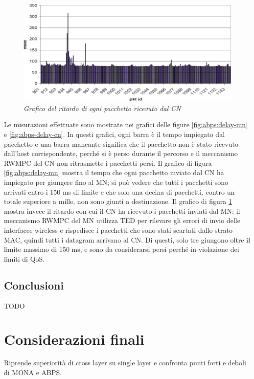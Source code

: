 \documentclass[12pt,a4paper,openright,twoside]{book}
\begin{document}
\begin{figure}
  \centering
  \includegraphics[width=\textwidth]{img/abps-delay-cn}
  \caption{\em Grafico del ritardo di ogni pacchetto ricevuto dal CN}
  \label{fig:abps:delay-cn}
\end{figure}

Le misurazioni effettuate sono mostrate nei grafici delle figure
\ref{fig:abps:delay-mn} e \ref{fig:abps-delay-cn}. In questi grafici,
ogni barra è il tempo impiegato dal pacchetto e una barra mancante
significa che il pacchetto non è stato ricevuto dall'host
corrispondente, perché si è perso durante il percorso e il meccanismo
RWMPC del CN non ritrasmette i pacchetti persi. Il grafico di figura
\ref{fig:abps:delay-mn} mostra il tempo che ogni pacchetto inviato dal
CN ha impiegato per giungere fino al MN; si può vedere che tutti i
pacchetti sono arrivati entro i 150 ms di limite e che solo una decina
di pacchetti, contro un totale superiore a mille, non sono giunti a
destinazione. Il grafico di figura \ref{fig:abps:delay-cn} mostra
invece il ritardo con cui il CN ha ricevuto i pacchetti inviati dal
MN; il meccanismo RWMPC del MN utilizza TED per rilevare gli errori di
invio delle interfacce wireless e rispedisce i pacchetti che sono
stati scartati dallo strato MAC, quindi tutti i datagram arrivano al
CN. Di questi, solo tre giungono oltre il limite massimo di 150 ms, e
sono da considerarsi persi perché in violazione dei limiti di QoS.

\section{Conclusioni}

TODO

\clearpage{\pagestyle{empty}\cleardoublepage}


\chapter{Considerazioni finali}
Riprende superiorità di cross layer su single layer e confronta punti
forti e deboli di MONA e ABPS.
\end{document}
